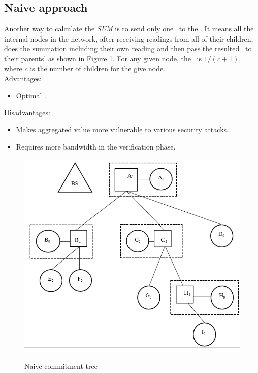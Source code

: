 	\subsection{Naive approach}
		Another way to calculate the \textit{SUM} is to send only one \payload\ to the \bs.
		It means all the internal nodes in the network, after receiving readings from all of their children, does the summation including their own reading and then pass the resulted \payload\ to their parents' as shown in Figure \ref{fig:naive-commitment-tree}.
		For any given node, the \inforate\ is $1 / (c + 1)$, where $c$ is the number of children for the give node.\\
		Advantages:
			\begin{itemize}
				\item Optimal \inforate.
			\end{itemize}
		Disadvantages:
			\begin{itemize}
				\item Makes aggregated value more vulnerable to various security attacks.
				\item Requires more bandwidth in the verification phase.
			\end{itemize}
		\begin{figure}[hp]
			\centering
			\includegraphics[scale = 0.6]{images/naive-commitment-tree.png}\\
			\caption{Naive commitment tree}
			\label{fig:naive-commitment-tree}
		\end{figure}


